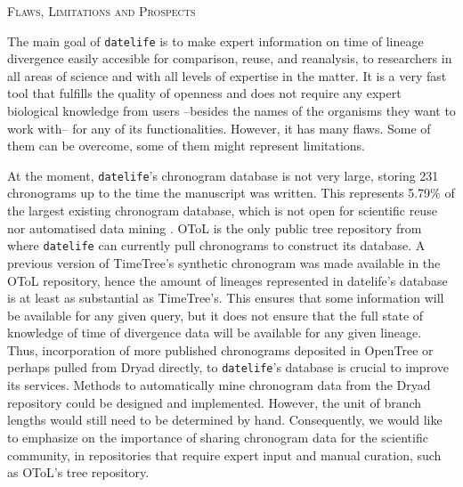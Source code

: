\documentclass[11pt,]{article}
\begin{document}
\begin{center}
\textsc{Flaws, Limitations and Prospects}
\end{center}

The main goal of \texttt{datelife} is to make expert information on time
of lineage divergence easily accesible for comparison, reuse, and
reanalysis, to researchers in all areas of science and with all levels
of expertise in the matter. It is a very fast tool that fulfills the
quality of openness and does not require any expert biological knowledge
from users --besides the names of the organisms they want to work with--
for any of its functionalities. However, it has many flaws. Some of them
can be overcome, some of them might represent limitations.

At the moment, \texttt{datelife}'s chronogram database is not very
large, storing 231 chronograms up to the time the manuscript was
written. This represents 5.79\% of the largest existing chronogram
database, which is not open for scientific reuse nor automatised data
mining \citep{Kumar2017}. OToL is the only public tree repository from
where \texttt{datelife} can currently pull chronograms to construct its
database. A previous version of TimeTree's synthetic chronogram
\citep{Hedges2015} was made available in the OToL repository, hence the
amount of lineages represented in datelife's database is at least as
substantial as TimeTree's. This ensures that some information will be
available for any given query, but it does not ensure that the full
state of knowledge of time of divergence data will be available for any
given lineage. Thus, incorporation of more published chronograms
deposited in OpenTree or perhaps pulled from Dryad directly, to
\texttt{datelife}'s database is crucial to improve its services. Methods
to automatically mine chronogram data from the Dryad repository could be
designed and implemented. However, the unit of branch lengths would
still need to be determined by hand. Consequently, we would like to
emphasize on the importance of sharing chronogram data for the
scientific community, in repositories that require expert input and
manual curation, such as OToL's tree repository.
\end{document}
